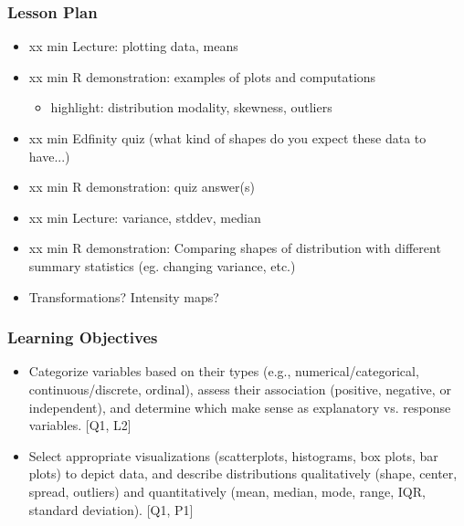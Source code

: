 \begin{frame}
    \frametitle{Lesson Plan}
    \begin{itemize}
        \item xx min Lecture: plotting data, means
        \item xx min R demonstration: examples of plots and computations
        \begin{itemize}
            \item  highlight: distribution modality, skewness, outliers
        \end{itemize}
        \item xx min Edfinity quiz (what kind of shapes do you expect these data to have...)
        \item xx min R demonstration: quiz answer(s)
        \item xx min Lecture: variance, stddev, median
        \item xx min R demonstration: Comparing shapes of distribution with different summary statistics (eg. changing variance, etc.)
        \item Transformations? Intensity maps?
    \end{itemize}
    \end{frame}
    
    \begin{frame}
    \frametitle{Learning Objectives}
    \begin{itemize}
        \item Categorize variables based on their types (e.g., numerical/categorical, continuous/discrete, ordinal), assess their association (positive, negative, or independent), and determine which make sense as explanatory vs. response variables. [Q1, L2]
        \item Select appropriate visualizations (scatterplots, histograms, box plots, bar plots) to depict data, and describe distributions qualitatively (shape, center, spread, outliers) and quantitatively (mean, median, mode, range, IQR, standard deviation). [Q1, P1] 
    \end{itemize}
    \end{frame}